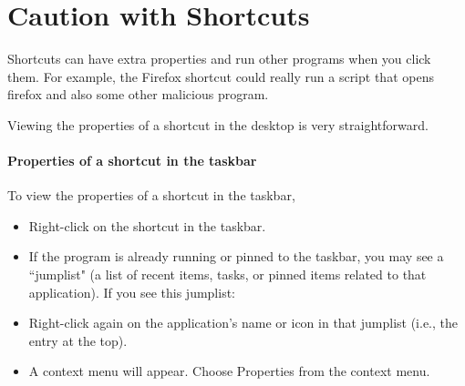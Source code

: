 \documentclass{article}
\begin{document}
\section{Caution with Shortcuts}
Shortcuts can have extra properties and run other programs when you click them.
For example, the Firefox shortcut could really run a script that opens firefox and also some
other malicious program.

\noindent Viewing the properties of a shortcut in the desktop is very straightforward.

\paragraph{Properties of a shortcut in the taskbar}
To view the properties of a shortcut in the taskbar, 
\begin{itemize}
\item Right-click on the shortcut in the taskbar.
\item If the program is already running or pinned to the taskbar, you may see a ``jumplist" (a list of recent items, tasks, or pinned items related to that application). If you see this jumplist:
\item Right-click again on the application's name or icon in that jumplist (i.e., the entry at the top).
\item A context menu will appear. Choose Properties from the context menu.
\end{itemize}
\end{document}
